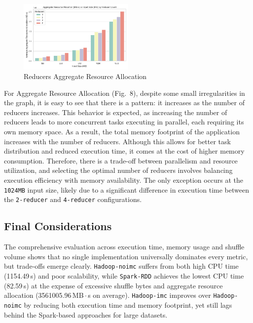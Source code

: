 \begin{figure}[H]
	\centering
	\includegraphics[width=0.5\textwidth]{images/Fig_Reducers_Aggregate_Resource_Allocation.png}
	\caption{Reducers Aggregate Resource Allocation}
	\label{fig:reducer-aggregate-resource-allocation}
\end{figure}

For Aggregate Resource Allocation (Fig.~8), despite some small irregularities in the graph, it is easy to see that there is a pattern: it increases as the number of reducers increases. This behavior is expected, as increasing the number of reducers leads to more concurrent tasks executing in parallel, each requiring its own memory space. As a result, the total memory footprint of the application increases with the number of reducers. Although this allows for better task distribution and reduced execution time, it comes at the cost of higher memory consumption. Therefore, there is a trade-off between parallelism and resource utilization, and selecting the optimal number of reducers involves balancing execution efficiency with memory availability. The only exception occurs at the \texttt{1024MB} input size, likely due to a significant difference in execution time between the \texttt{2-reducer} and \texttt{4-reducer} configurations. 


\subsection{Final Considerations}
The comprehensive evaluation across execution time, memory usage and shuffle volume shows that no single implementation universally dominates every metric, but trade‑offs emerge clearly. \texttt{Hadoop-noimc} suffers from both high CPU time (1154.49\,s) and poor scalability, while \texttt{Spark-RDD} achieves the lowest CPU time (82.59\,s) at the expense of excessive shuffle bytes and aggregate resource allocation (3561005.96\,MB\,$\cdot$\,s on average). \texttt{Hadoop-imc} improves over \texttt{Hadoop-noimc} by reducing both execution time and memory footprint, yet still lags behind the Spark-based approaches for large datasets.

